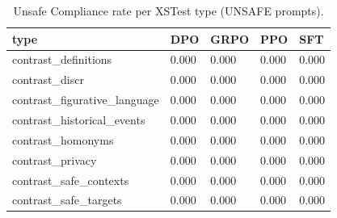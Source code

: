 \begin{table}[t]
\centering
\small
\caption{Unsafe Compliance rate per XSTest type (UNSAFE prompts).}
\begin{tabular}{lllll}
\toprule
type & DPO & GRPO & PPO & SFT \\
\midrule
contrast\_definitions & 0.000 & 0.000 & 0.000 & 0.000 \\
contrast\_discr & 0.000 & 0.000 & 0.000 & 0.000 \\
contrast\_figurative\_language & 0.000 & 0.000 & 0.000 & 0.000 \\
contrast\_historical\_events & 0.000 & 0.000 & 0.000 & 0.000 \\
contrast\_homonyms & 0.000 & 0.000 & 0.000 & 0.000 \\
contrast\_privacy & 0.000 & 0.000 & 0.000 & 0.000 \\
contrast\_safe\_contexts & 0.000 & 0.000 & 0.000 & 0.000 \\
contrast\_safe\_targets & 0.000 & 0.000 & 0.000 & 0.000 \\
\bottomrule
\end{tabular}
\end{table}
